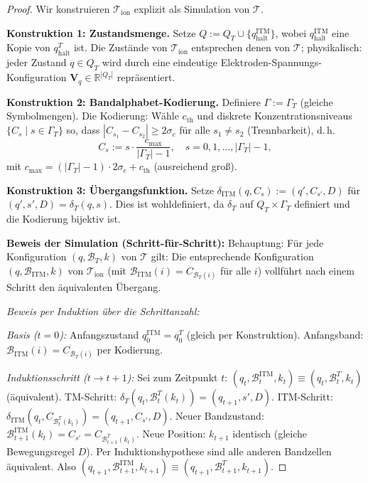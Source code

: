 ﻿\documentclass[a4paper,12pt]{article}
\theoremstyle{plain}
\theoremstyle{definition}
\theoremstyle{remark}
\newcommand{\ITM}{\mathcal{T}_{\mathrm{ion}}}
\newcommand{\cth}{c_{\mathrm{th}}}
\begin{document}
\begin{proof}
Wir konstruieren $\ITM$ explizit als Simulation von $\mathcal{T}$.

\textbf{Konstruktion 1: Zustandsmenge.}
Setze $Q := Q_T \cup \{q_{\mathrm{halt}}^{\mathrm{ITM}}\}$, wobei
$q_{\mathrm{halt}}^{\mathrm{ITM}}$ eine Kopie von $q_{\mathrm{halt}}^T$ ist.
Die Zust\"ande von $\ITM$ entsprechen denen von $\mathcal{T}$;
physikalisch: jeder Zustand $q \in Q_T$ wird durch eine eindeutige
Elektroden-Spannungs-Konfiguration $\mathbf{V}_q \in \mathbb{R}^{|Q_T|}$
repr\"asentiert.

\textbf{Konstruktion 2: Bandalphabet-Kodierung.}
Definiere $\Gamma := \Gamma_T$ (gleiche Symbolmengen).
Die Kodierung: W\"ahle $\cth$ und diskrete Konzentrationsniveaus
$\{C_s \mid s \in \Gamma_T\}$ so, dass
$|C_{s_1} - C_{s_2}| \geq 2\sigma_c$ f\"ur alle $s_1 \neq s_2$
(Trennbarkeit), d.\,h.\
\[
C_s := s \cdot \frac{c_{\max}}{|\Gamma_T| - 1}, \quad s = 0, 1, \ldots, |\Gamma_T|-1,
\]
mit $c_{\max} = (|\Gamma_T|-1) \cdot 2\sigma_c + \cth$ (ausreichend gro{\ss}).

\textbf{Konstruktion 3: \"Ubergangsfunktion.}
Setze $\delta_{\mathrm{ITM}}(q, C_s) := (q', C_{s'}, D)$
f\"ur $(q', s', D) = \delta_T(q, s)$.
Dies ist wohldefiniert, da $\delta_T$ auf $Q_T \times \Gamma_T$ definiert
und die Kodierung bijektiv ist.

\textbf{Beweis der Simulation (Schritt-f\"ur-Schritt):}
Behauptung: F\"ur jede Konfiguration $(q, \mathcal{B}_T, k)$ von $\mathcal{T}$
gilt: Die entsprechende Konfiguration $(q, \mathcal{B}_{\mathrm{ITM}}, k)$ von $\ITM$
(mit $\mathcal{B}_{\mathrm{ITM}}(i) = C_{\mathcal{B}_T(i)}$ f\"ur alle $i$)
vollf\"uhrt nach einem Schritt den \"aquivalenten \"Ubergang.

\emph{Beweis per Induktion \"uber die Schrittanzahl:}

\emph{Basis ($t = 0$):} Anfangszustand $q_0^{\mathrm{ITM}} = q_0^T$ (gleich per Konstruktion).
Anfangsband: $\mathcal{B}_{\mathrm{ITM}}(i) = C_{\mathcal{B}_T(i)}$ per Kodierung. \checkmark

\emph{Induktionsschritt ($t \to t+1$):}
Sei zum Zeitpunkt $t$: $(q_t, \mathcal{B}_t^{\mathrm{ITM}}, k_t) \equiv (q_t, \mathcal{B}_t^T, k_t)$ (\"aquivalent).
TM-Schritt: $\delta_T(q_t, \mathcal{B}_t^T(k_t)) = (q_{t+1}, s', D)$.
ITM-Schritt: $\delta_{\mathrm{ITM}}(q_t, C_{\mathcal{B}_t^T(k_t)}) = (q_{t+1}, C_{s'}, D)$.
Neuer Bandzustand: $\mathcal{B}_{t+1}^{\mathrm{ITM}}(k_t) = C_{s'} = C_{\mathcal{B}_{t+1}^T(k_t)}$.
Neue Position: $k_{t+1}$ identisch (gleiche Bewegungsregel $D$).
Per Induktionshypothese sind alle anderen Bandzellen \"aquivalent.
Also $(q_{t+1}, \mathcal{B}_{t+1}^{\mathrm{ITM}}, k_{t+1}) \equiv (q_{t+1}, \mathcal{B}_{t+1}^T, k_{t+1})$. \checkmark


\end{proof}
\end{document}
